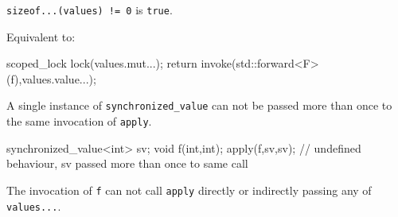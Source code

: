 \begin{itemdescr}
    

\pnum
\constraints
\texttt{sizeof...(values)\ !=\ 0} is \texttt{true}.

\pnum
\effects
Equivalent to:

\begin{codeblock}
    scoped_lock lock(values.mut...);
    return invoke(std::forward<F>(f),values.value...);
\end{codeblock}

\begin{note} A single instance of \texttt{synchronized\_value} can not be
passed more than once to the same invocation of \texttt{apply}.
\begin{example}

\begin{codeblock}
      synchronized_value<int> sv;
      void f(int,int);
      apply(f,sv,sv); // undefined behaviour, sv passed more than once to same call
\end{codeblock}
\end{example}
 \end{note}

\begin{note} The invocation of \texttt{f} can not call \texttt{apply}
directly or indirectly passing any of \texttt{values...}. 
\end{note}
\end{itemdescr}

